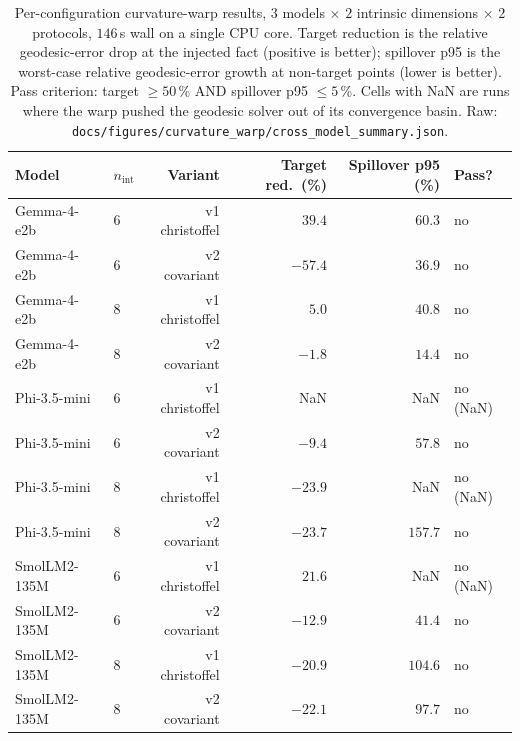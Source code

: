 \documentclass[11pt]{article}
\begin{document}
\begin{table}[h]\centering\footnotesize
\caption{Per-configuration curvature-warp results, $3$ models $\times$
$2$ intrinsic dimensions $\times$ $2$ protocols, $146$\,s wall on a
single CPU core. Target reduction is the relative geodesic-error drop
at the injected fact (positive is better); spillover p95 is the
worst-case relative geodesic-error growth at non-target points
(lower is better). Pass criterion: target $\geq 50$\,\% AND spillover
p95 $\leq 5$\,\%. Cells with NaN are runs where the warp pushed the
geodesic solver out of its convergence basin. Raw:
\texttt{docs/figures/curvature\_warp/cross\_model\_summary.json}.}
\label{tab:warp-x12}
\begin{tabular}{@{}llrrrl@{}}
\toprule
Model & $n_\text{int}$ & Variant & Target red.\ (\%) & Spillover p95 (\%) & Pass?\\
\midrule
Gemma-4-e2b   & 6 & v1 christoffel & $39.4$  & $60.3$  & no \\
Gemma-4-e2b   & 6 & v2 covariant   & $-57.4$ & $36.9$  & no \\
Gemma-4-e2b   & 8 & v1 christoffel & $5.0$   & $40.8$  & no \\
Gemma-4-e2b   & 8 & v2 covariant   & $-1.8$  & $14.4$  & no \\
Phi-3.5-mini  & 6 & v1 christoffel & NaN     & NaN     & no (NaN) \\
Phi-3.5-mini  & 6 & v2 covariant   & $-9.4$  & $57.8$  & no \\
Phi-3.5-mini  & 8 & v1 christoffel & $-23.9$ & NaN     & no (NaN) \\
Phi-3.5-mini  & 8 & v2 covariant   & $-23.7$ & $157.7$ & no \\
SmolLM2-135M  & 6 & v1 christoffel & $21.6$  & NaN     & no (NaN) \\
SmolLM2-135M  & 6 & v2 covariant   & $-12.9$ & $41.4$  & no \\
SmolLM2-135M  & 8 & v1 christoffel & $-20.9$ & $104.6$ & no \\
SmolLM2-135M  & 8 & v2 covariant   & $-22.1$ & $97.7$  & no \\
\bottomrule
\end{tabular}
\end{table}
\end{document}
